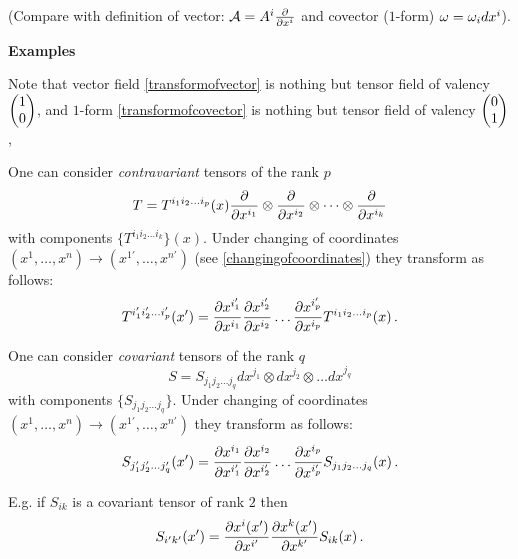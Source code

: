 \documentclass[12pt]{article}
\theoremstyle{theorem}
\numberwithin{equation}{section}
\begin{document}
(Compare with definition of vector: ${\cal A}=A^i{\partial\over \partial x^i}$
and covector ($1$-form) $\omega=\omega_idx^i$).



\centerline {\bf Examples}

\smallskip


    Note that vector field \eqref{transformofvector} is nothing but
 tensor field of valency 
$\begin{pmatrix}1 \cr 0\cr\end{pmatrix}$,
and $1$-form \eqref{transformofcovector} is nothing but
tensor field of valency 
$\begin{pmatrix}0 \cr 1\cr\end{pmatrix}$,

\medskip


One can consider {\it contravariant} tensors  of the rank $p$
                   $$
             T=  T^{i_1i_2\dots i_p}(x){\partial\over \partial x^{i_1}}\otimes
             {\partial\over \partial x^{i_2}}\otimes \dots \otimes {\partial\over \partial x^{i_k}}
                   $$
with components $\{T^{i_1i_2\dots i_k}\}(x)$.
Under changing of coordinates 
$(x^1,\dots,x^n)\to (x^{1'},\dots,x^{n'})$ (see
\eqref{changingofcoordinates}) they transform as follows:
            \begin{equation}\label{transformofcontrtensors}
T^{i'_1i'_2\dots i'_p}(x')={\partial x^{i'_1}\over \partial x^{i_1}}
                       {\partial x^{i'_2}\over \partial x^{i_2}}\dots
                       {\partial x^{i'_p}\over \partial x^{i_p}}
                     T^{i_1i_2\dots i_p}(x)\,.
                         \end{equation}

One can consider {\it covariant} tensors  of the rank $q$
                   $$
             S=  S_{j_1j_2\dots j_q}dx^{j_1}\otimes
              dx^{j_2}\otimes \dots dx^{j_q}
                   $$
with components $\{S_{j_1j_2\dots j_q}\}$.
Under changing of coordinates 
$(x^1,\dots,x^n)\to (x^{1'},\dots,x^{n'})$ 
they transform as follows:
            \begin{equation*}\label{transformofcotensors}
S_{j'_1j'_2\dots j'_q}(x')={\partial x^{i_1}\over \partial x^{i'_1}}
                       {\partial x^{i_2}\over \partial x^{i'_2}}\dots
                       {\partial x^{i_p}\over \partial x^{i'_p}}
                     S_{j_1j_2\dots j_q}(x)\,.
                         \end{equation*}


E.g. if $S_{ik}$ is a covariant tensor
of rank $2$ then
            \begin{equation}\label{ruleoftransformfor2tensor}
                S_{i'k'}(x')=
   {\partial x^i(x')\over \partial x^{i'}}
   {\partial x^k(x')\over \partial x^{k'}}
             S_{ik}(x)\,.
            \end{equation}
\end{document}
